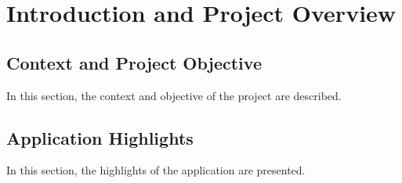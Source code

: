\chapter{Introduction and Project Overview}\label{ch:introduction-and-project-overview}


\section{Context and Project Objective}\label{sec:context-and-project-objective}

In this section, the context and objective of the project are described.

\section{Application Highlights}\label{sec:application-highlights}

In this section, the highlights of the application are presented.
